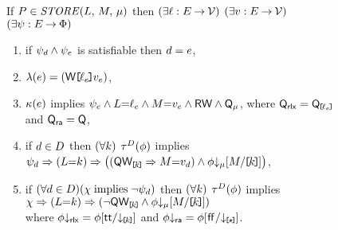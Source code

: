 \begin{figure*}
  \begin{center}
  \begin{minipage}{0.88\textwidth}
  \noindent
  If $\aPS \in \sSTORE[\amode]{\cExp}{\aExp}$ then
  $(\exists\cVal:\aEvs\fun\Val)$
  $(\exists\aVal:\aEvs\fun\Val)$
  $(\exists\bForm:\aEvs\fun\Formulae)$
  \begin{enumerate}
  \item if $\bForm_\bEv\land\bForm_\aEv$ is satisfiable then $\bEv=\aEv$,
  \item $\labelingAct(\aEv) = \DWREFP{\cVal_\aEv}{\aVal_\aEv}$,
  \item 
    $\labelingForm(\aEv)$ implies
    \begin{math}
      \bForm_\aEv
      \land \cExp{=}\cVal_\aEv
      \land \aExp{=}\aVal_\aEv
      \land \RW
      \land \Qmode{\amode}
    \end{math},
    where
    $\Qmode{\mRLX}=\QxREF{\cVal_\aEv}$ and $\Qmode{\mRA}=\Q$, %
  \item if
    $\bEv\in\bEvs$
    then
    \begin{math}
      (\forall\dVal)
    \end{math}
    $\aTr[\bEvs](\aForm)$ implies 
    \begin{math}
      \bForm_\bEv
      \limplies (\cExp{=}\dVal)
      \limplies \PBRbig{
        (\QwREF{\dVal} \limplies \aExp{=}\aVal_\bEv)
        \land \aForm \Dmode{\amode}[\aExp/\REF{\dVal}]
      }
    \end{math},
  \item if 
    \begin{math}
      (\forall\bEv\in\bEvs)(\cForm \textimplies
      \lnot\bForm_\bEv)
    \end{math}
    then
    \begin{math}
      (\forall\dVal)
    \end{math}
    $\aTr[\bEvs](\aForm)$ implies 
    \begin{math}
      \cForm
      \limplies (\cExp{=}\dVal)
      \limplies \PBR{
        \lnot\QwREF{\dVal}
        \land \aForm \Dmode{\amode}[\aExp/\REF{\dVal}]
      }
    \end{math}
    \\ where 
      $\aForm\Dmode{\mRLX}=\aForm[\TRUE/\DxREF{\dVal}]$ and
      $\aForm\Dmode{\mRA}=\aForm[\FALSE/\DREF]$. %
  \end{enumerate}

\end{minipage}
\end{center}
\end{figure*}
